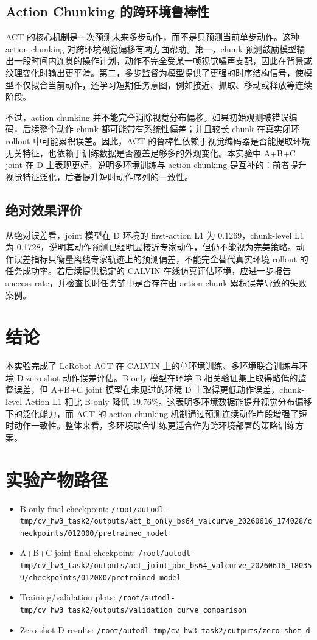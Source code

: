 \documentclass[10pt,a4paper]{ctexart}
\begin{document}
\subsection{Action Chunking 的跨环境鲁棒性}
ACT 的核心机制是一次预测未来多步动作，而不是只预测当前单步动作。这种 action chunking 对跨环境视觉偏移有两方面帮助。第一，chunk 预测鼓励模型输出一段时间内连贯的操作计划，动作不完全受某一帧视觉噪声支配，因此在背景或纹理变化时输出更平滑。第二，多步监督为模型提供了更强的时序结构信号，使模型不仅拟合当前动作，还学习短期任务意图，例如接近、抓取、移动或释放等连续阶段。

不过，action chunking 并不能完全消除视觉分布偏移。如果初始观测被错误编码，后续整个动作 chunk 都可能带有系统性偏差；并且较长 chunk 在真实闭环 rollout 中可能累积误差。因此，ACT 的鲁棒性依赖于视觉编码器是否能提取环境无关特征，也依赖于训练数据是否覆盖足够多的外观变化。本实验中 A+B+C joint 在 D 上表现更好，说明多环境训练与 action chunking 是互补的：前者提升视觉特征泛化，后者提升短时动作序列的一致性。

\subsection{绝对效果评价}
从绝对误差看，joint 模型在 D 环境的 first-action L1 为 0.1269，chunk-level L1 为 0.1728，说明其动作预测已经明显接近专家动作，但仍不能视为完美策略。动作误差指标只衡量离线专家轨迹上的预测偏差，不能完全替代真实环境 rollout 的任务成功率。若后续提供稳定的 CALVIN 在线仿真评估环境，应进一步报告 success rate，并检查长时任务链中是否存在由 action chunk 累积误差导致的失败案例。

\section{结论}
本实验完成了 LeRobot ACT 在 CALVIN 上的单环境训练、多环境联合训练与环境 D zero-shot 动作误差评估。B-only 模型在环境 B 相关验证集上取得略低的监督误差，但 A+B+C joint 模型在未见过的环境 D 上取得更低动作误差，chunk-level Action L1 相比 B-only 降低 19.76\%。这表明多环境数据能提升视觉分布偏移下的泛化能力，而 ACT 的 action chunking 机制通过预测连续动作片段增强了短时动作一致性。整体来看，多环境联合训练更适合作为跨环境部署的策略训练方案。

\appendix
\section{实验产物路径}
\begin{itemize}[leftmargin=1.2em,itemsep=0.25em]
  \item B-only final checkpoint: \texttt{/root/autodl-tmp/cv\_hw3\_task2/outputs/act\_b\_only\_bs64\_valcurve\_20260616\_174028/checkpoints/012000/pretrained\_model}
  \item A+B+C joint final checkpoint: \texttt{/root/autodl-tmp/cv\_hw3\_task2/outputs/act\_joint\_abc\_bs64\_valcurve\_20260616\_180359/checkpoints/012000/pretrained\_model}
  \item Training/validation plots: \texttt{/root/autodl-tmp/cv\_hw3\_task2/outputs/validation\_curve\_comparison}
  \item Zero-shot D results: \texttt{/root/autodl-tmp/cv\_hw3\_task2/outputs/zero\_shot\_d}
\end{itemize}
\end{document}
